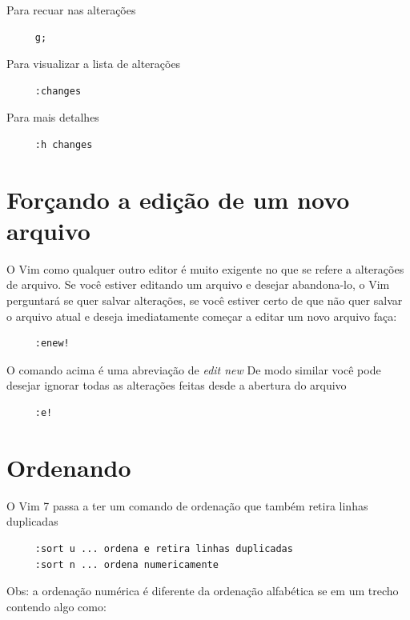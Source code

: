 \documentclass[10pt,a4paper,openany]{book}
\begin{document}
Para recuar nas alterações

\begin{verbatim}
     g;
\end{verbatim}

Para visualizar a lista de alterações

\begin{verbatim}
     :changes
\end{verbatim}

Para mais detalhes

\begin{verbatim}
     :h changes
\end{verbatim}


\section{Forçando a edição de um novo arquivo}\label{sec:Forçando a edição de um novo arquivo}

O Vim como qualquer outro editor é muito exigente no que se refere a alterações
de arquivo.  Se você estiver editando um arquivo e desejar abandona-lo, o Vim
perguntará se quer salvar alterações, se você estiver certo de que não quer
salvar o arquivo atual e deseja imediatamente começar a editar um novo arquivo
faça:

\begin{verbatim}
     :enew!
\end{verbatim}

O comando acima é uma abreviação de {\em edit new} De modo similar você pode
desejar ignorar todas as alterações feitas desde a abertura do arquivo

\begin{verbatim}
     :e!
\end{verbatim}


\section{Ordenando}

O Vim 7 passa a ter um comando de ordenação que também retira linhas
duplicadas

\begin{verbatim}
     :sort u ... ordena e retira linhas duplicadas
     :sort n ... ordena numericamente
\end{verbatim}

Obs: a ordenação numérica é diferente da ordenação alfabética se em um
trecho contendo algo como:
\end{document}
